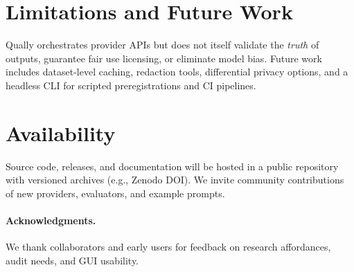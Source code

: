 \documentclass[11pt,a4paper]{article}
\begin{document}
\section{Limitations and Future Work}
\label{sec:limitations}
Qually orchestrates provider APIs but does not itself validate the \emph{truth} of outputs, guarantee fair use licensing, or eliminate model bias. Future work includes dataset-level caching, redaction tools, differential privacy options, and a headless CLI for scripted preregistrations and CI pipelines.

\section{Availability}
\label{sec:availability}
Source code, releases, and documentation will be hosted in a public repository with versioned archives (e.g., Zenodo DOI). We invite community contributions of new providers, evaluators, and example prompts.

\paragraph{Acknowledgments.} We thank collaborators and early users for feedback on research affordances, audit needs, and GUI usability.



\end{document}
